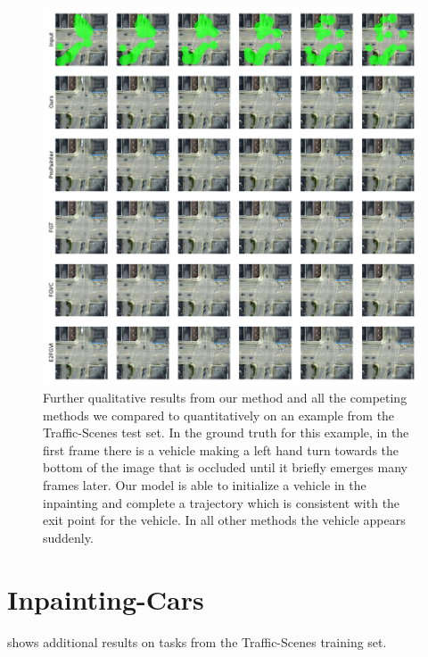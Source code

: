 \begin{figure}[h]
\begin{center}
    \centering
    \captionsetup{type=figure}
    \includegraphics[width=\linewidth]{figures/additional-samples/ts2.pdf}
    \caption[Further qualitative results from our method and all competing methods on another example from the Traffic-Scenes test set.]{Further qualitative results from our method and all the competing methods we compared to quantitatively on an example from the Traffic-Scenes test set. In the ground truth for this example, in the first frame there is a vehicle making a left hand turn towards the bottom of the image that is occluded until it briefly emerges many frames later. Our model is able to initialize a vehicle in the inpainting and complete a trajectory which is consistent with the exit point for the vehicle. In all other methods the vehicle appears suddenly. } 
    \label{fig:ts2}
\end{center}
\end{figure}

\section{Inpainting-Cars}
 shows additional results on tasks from the Traffic-Scenes training set.


